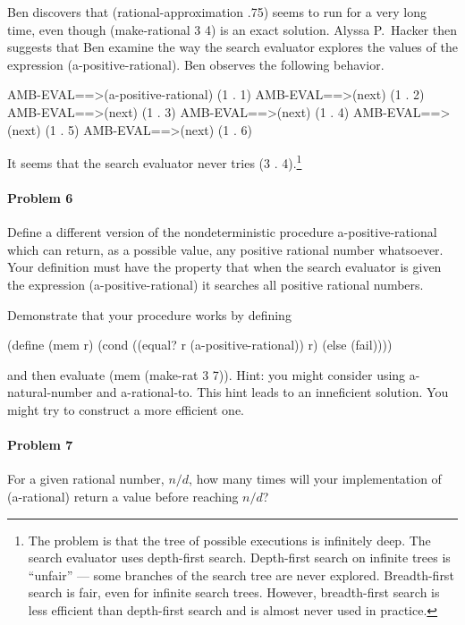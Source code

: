Ben discovers that {\cf (rational-approximation .75)}
seems to run for a very long time, even though {\cf (make-rational 3 4)}
is an exact solution.  Alyssa P.~Hacker then suggests that Ben examine
the way the search evaluator explores the values of the expression
{\cf (a-positive-rational)}.  Ben observes the following behavior.

\beginlisp
AMB-EVAL==>(a-positive-rational)
(1 . 1)
\null
AMB-EVAL==>(next)
(1 . 2)
\null
AMB-EVAL==>(next)
(1 . 3)
\null
AMB-EVAL==>(next)
(1 . 4)
\null
AMB-EVAL==>(next)
(1 . 5)
\null
AMB-EVAL==>(next)
(1 . 6)
\endlisp

It seems that the search evaluator never tries {\cf (3 .
4)}.\footnote{The problem is that the tree of possible executions is
infinitely deep.  The search evaluator uses depth-first search.
Depth-first search on infinite trees is ``unfair'' --- some branches
of the search tree are never explored.  Breadth-first search is fair,
even for infinite search trees.  However, breadth-first search is
less efficient than depth-first search and is almost never used in
practice.}

\paragraph{Problem 6}

Define a different version of the nondeterministic procedure {\cf a-positive-rational}
which can return, as a possible value, any positive rational number whatsoever.
Your definition must have the property that when the search
evaluator is given the expression {\cf (a-positive-rational)} it
searches all positive
rational numbers.

Demonstrate that your procedure works by defining

\beginlisp
(define (mem r)
  (cond ((equal? r (a-positive-rational)) r)
        (else (fail))))
\endlisp

and then evaluate {\cf (mem (make-rat 3 7))}.  Hint: you might consider
using {\cf a-natural-number} and {\cf a-rational-to}.  This
hint leads to an inneficient solution.  You might try to construct a more
efficient one.

\paragraph{Problem 7}

For a given rational number, $n/d$, how many times will your implementation
of {\cf (a-rational)} return a value before reaching $n/d$?

